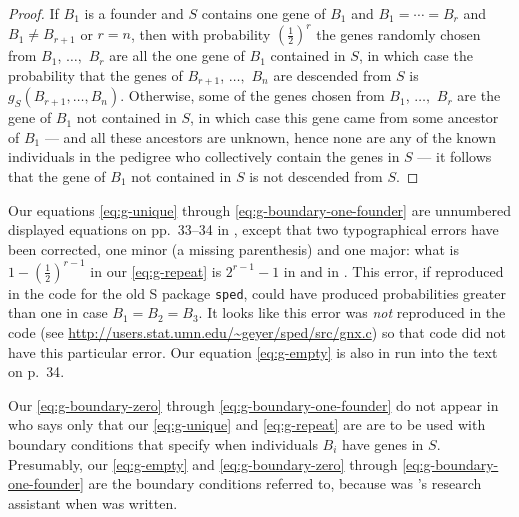 \documentclass[11pt]{article}
\begin{document}
\begin{proof}
If $B_1$ is a founder and $S$ contains one gene of $B_1$
and $B_1 = \cdots = B_r$ and $B_1 \neq B_{r + 1}$ or $r = n$, then
with probability $(\tfrac{1}{2})^r$ the genes randomly chosen from
$B_1$, $\ldots,$ $B_r$ are all the one gene of $B_1$ contained in $S$,
in which case the probability that the genes of $B_{r + 1}$, $\ldots,$ $B_n$
are descended from $S$ is $g_S(B_{r + 1}, \ldots, B_n)$.
Otherwise, some of the genes chosen from $B_1$, $\ldots,$ $B_r$ are the
gene of $B_1$ not contained in $S$, in which case this gene came from some
ancestor of $B_1$ --- and all these ancestors are unknown, hence none
are any of the known individuals in the pedigree who collectively contain
the genes in $S$ --- it follows that the gene of $B_1$ not contained in $S$
is not descended from $S$.
\end{proof}

Our equations \eqref{eq:g-unique} through \eqref{eq:g-boundary-one-founder}
are unnumbered displayed equations on pp.~{33--34} in \citet{geyer},
except that two typographical errors have been corrected, one minor (a missing
parenthesis) and one major: what is $1 - (\tfrac{1}{2})^{r - 1}$
in our \eqref{eq:g-repeat} is $2^{r - 1} - 1$ in \citet{geyer} and in
\citet[equation (7)]{thompson}.  This error, if reproduced in the code
for the old S package \texttt{sped}, could have produced probabilities greater
than one in case $B_1 = B_2 = B_3$.  It looks like this error was \emph{not}
reproduced in the code
(see \url{http://users.stat.umn.edu/~geyer/sped/src/gnx.c})
so that code did not have this particular error.
Our equation \eqref{eq:g-empty} is also in \citet{geyer} run into the text
on p.~{34}.

Our \eqref{eq:g-boundary-zero} through \eqref{eq:g-boundary-one-founder}
do not appear in \citet{thompson} who says only
that our \eqref{eq:g-unique} and \eqref{eq:g-repeat} are
are to be used with boundary conditions that specify when individuals
$B_i$ have genes in $S$.
Presumably,
our \eqref{eq:g-empty} and
\eqref{eq:g-boundary-zero} through \eqref{eq:g-boundary-one-founder}
are the boundary
conditions \citeauthor{thompson} referred to, because \citeauthor{geyer}
was \citeauthor{thompson}'s research assistant when \citet{geyer} was written.
\end{document}
